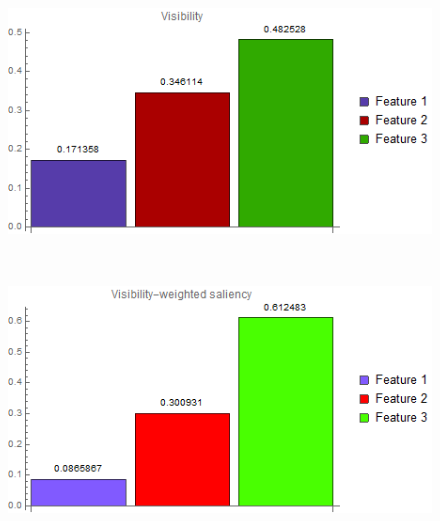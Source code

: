 \begin{figure}
\begin{minipage}{.15\textwidth}
		\subcaption{}
	\end{minipage}~
	\begin{minipage}{.25\textwidth}
		\includegraphics[width=1\linewidth]{images/nucleon_naive_optimized_linesearch_visibility_chart}
		\subcaption{}
	\end{minipage}~
	\begin{minipage}{.25\textwidth}
		\includegraphics[width=1\linewidth]{images/nucleon_naive_optimized_linesearch_visibility_saliency_weighted_chart}
		\subcaption{}
	\end{minipage}
	

\end{figure}
